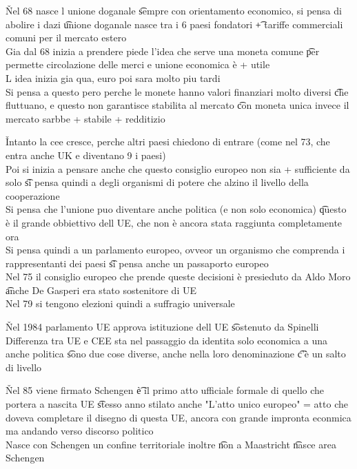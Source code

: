 \documentclass[12pt]{article}
\begin{document}
\v

Nel 68 nasce l unione doganale \t sempre con orientamento economico, si pensa di abolire i dazi \t unione doganale nasce tra i 6 paesi fondatori \t + tariffe commerciali comuni per il mercato estero \\
Gia dal 68 inizia a prendere piede l'idea che serve una moneta comune \t per permette circolazione delle merci e unione economica è + utile \\
L idea inizia gia qua, euro poi sara molto piu tardi \\
Si pensa a questo pero perche le monete hanno valori finanziari molto diversi \t che fluttuano, e questo non garantisce stabilita al mercato \t con moneta unica invece il mercato sarbbe + stabile + redditizio

\v

Intanto la cee cresce, perche altri paesi chiedono di entrare (come nel 73, che entra anche UK e diventano 9 i paesi) \\
Poi si inizia a pensare anche che questo consiglio europeo non sia + sufficiente da solo \t si pensa quindi a degli organismi di potere che alzino il livello della cooperazione \\
Si pensa che l'unione puo diventare anche politica (e non solo economica) \t questo è il grande obbiettivo dell UE, che non è ancora stata raggiunta completamente ora \\
Si pensa quindi a un parlamento europeo, ovveor un organismo che comprenda i rappresentanti dei paesi \t si pensa anche un passaporto europeo \\
Nel 75 il consiglio europeo che prende queste decisioni è presieduto da Aldo Moro \t anche De Gasperi era stato sostenitore di UE \\
Nel 79 si tengono elezioni quindi a suffragio universale

\v

Nel 1984 parlamento UE approva istituzione dell UE \t sostenuto da Spinelli \\
Differenza tra UE e CEE sta nel passaggio da identita solo economica a una anche politica \t sono due cose diverse, anche nella loro denominazione \t c'è un salto di livello

\v

Nel 85 viene firmato Schengen \t è il primo atto ufficiale formale di quello che portera a nascita UE \t stesso anno stilato anche "L'atto unico europeo" = atto che doveva completare il disegno di questa UE, ancora con grande impronta econmica ma andando verso discorso politico \\
Nasce con Schengen un confine territoriale inoltre \t non a Maastricht \t nasce area Schengen
\end{document}
